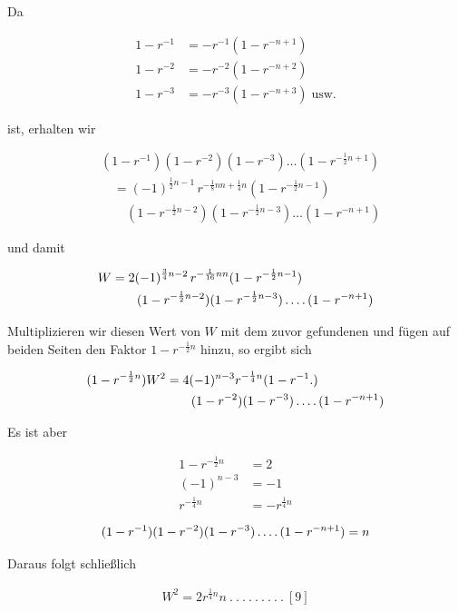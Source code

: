 Da

\[
\begin{aligned}
1-r^{-1}&=-r^{-1}(1-r^{-n+1})\\
1-r^{-2}&=-r^{-2}(1-r^{-n+2})\\
1-r^{-3}&=-r^{-3}(1-r^{-n+3})\;\text{usw.}
\end{aligned}
\]

ist, erhalten wir

\[
\begin{aligned}
&(1-r^{-1})(1-r^{-2})(1-r^{-3})\ldots(1-r^{-\frac12n+1})\\
&\quad=(-1)^{\frac12n-1}\,r^{-\frac18nn+\frac14n}(1-r^{-\frac12n-1})\\&\qquad(1-r^{-\frac12n-2})(1-r^{-\frac12n-3})\ldots(1-r^{-n+1})
\end{aligned}
\]

und damit

\[
\begin{aligned}
W&=2(-1)^{\frac34n-2}\,r^{-\frac1{16}nn}(1-r^{-\frac12n-1})\\&\qquad(1-r^{-\frac12n-2})(1-r^{-\frac12n-3})\mathinner{.\,.\,.\,.}(1-r^{-n+1})
\end{aligned}
\]

Multiplizieren wir diesen Wert von $W$ mit dem zuvor gefundenen und fügen auf beiden Seiten den Faktor $1-r^{-\frac12n}$ hinzu, so ergibt sich

\[
\begin{aligned}
(1-r^{-\frac12n})W^2&=4(-1)^{n-3}r^{-\frac14n}(1-r^{-1}\mathord{.})\\&\qquad(1-r^{-2})(1-r^{-3})\mathinner{.\,.\,.\,.}(1-r^{-n+1})
\end{aligned}
\]

Es ist aber

\[
\begin{aligned}
1-r^{-\frac12n}&=2\\
(-1)^{n-3}&=-1\\
r^{-\frac14n}&=-r^{\frac14n}
\end{aligned}
\]

\[
\begin{aligned}
(1-r^{-1})(1-r^{-2})(1-r^{-3})\mathinner{.\,.\,.\,.}(1-r^{-n+1})=n
\end{aligned}
\]

Daraus folgt schließlich


\[
\begin{aligned}
W^2=2r^{\frac14n}n\  .\  .\  .\  .\  .\  .\  .\  .\  .\ [9]
\end{aligned}
\]

